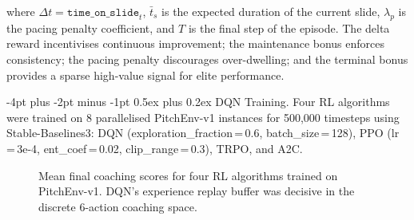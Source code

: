 \documentclass{article}
\makeatletter
\renewcommand\paragraph{\@startsection{paragraph}{4}{\z@}%
  {-4pt plus -2pt minus -1pt}%
  {0.5ex plus 0.2ex}%
  {\normalsize\bf}}
\makeatother
\begin{document}
where $\Delta t = \texttt{time\_on\_slide}_t$, $\bar{t}_s$ is the
expected duration of the current slide, $\lambda_p$ is the pacing
penalty coefficient, and $T$ is the final step of the episode.
The delta reward incentivises continuous improvement; the maintenance bonus
enforces consistency; the pacing penalty discourages over-dwelling; and
the terminal bonus provides a sparse high-value signal for elite performance.

\paragraph{DQN Training.}
Four RL algorithms were trained on 8 parallelised PitchEnv-v1
instances for 500{,}000 timesteps using Stable-Baselines3:
DQN (exploration\_fraction\,=\,0.6, batch\_size\,=\,128),
PPO (lr\,=\,3e-4, ent\_coef\,=\,0.02, clip\_range\,=\,0.3),
TRPO, and A2C.

\begin{figure}[htbp]
\centering
{}
\caption{Mean final coaching scores for four RL algorithms trained on
         PitchEnv-v1. DQN's experience replay buffer was decisive in the
         discrete 6-action coaching space.}
\label{fig:rl_comparison}
\end{figure}
\end{document}

